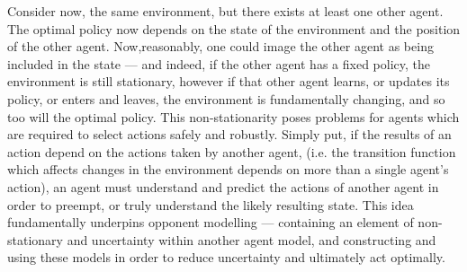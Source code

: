 \newline \newline
Consider now, the same environment, but there exists at least one other agent. The optimal policy now depends on the state of the environment and the position of the other agent. Now,reasonably, one could image the other agent as being included in the state --- and indeed, if the other agent has a fixed policy, the environment is still stationary, however if that other agent learns, or updates its policy, or enters and leaves, the environment is fundamentally changing, and so too will the optimal policy.
\newline\newline
This non-stationarity poses problems for agents which are required to select actions safely and robustly. Simply put, if the results of an action depend on the actions taken by another agent, (i.e. the transition function which affects changes in the environment depends on more than a single agent's action), an agent must understand and predict the actions of another agent in order to preempt, or truly understand the likely resulting state. This idea fundamentally underpins opponent modelling --- containing an element of non-stationary and uncertainty within another agent model, and constructing and using these models in order to reduce uncertainty and ultimately act optimally. 


